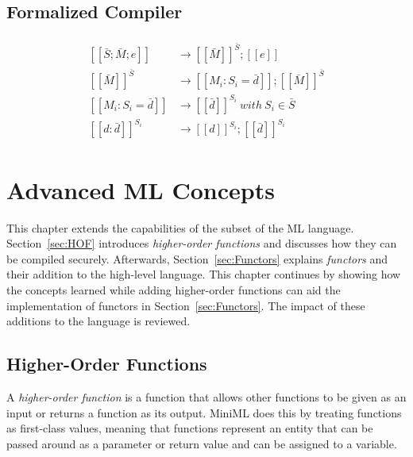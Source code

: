 \documentclass[10pt,a4paper]{report}
\begin{document}


\section{Formalized Compiler}
\newcommand{\compile}[1]{\left[\left[#1\right]\right]}
\newcommand{\makes}{& \rightarrow}
\begin{align*}
\begin{aligned}
\compile{\bar{S};\bar{M};e} \makes \compile{\bar{M}}^{\bar{S}};\compile{e}\\ 
\compile{\bar{M}}^{\bar{S}}\makes \compile{M_{i}:S_{i} = \bar{d}};\compile{\bar{M}}^{\bar{S}}\\
\compile{M_{i}:S_{i} = \bar{d}} \makes \compile{\bar{d}}^{S_{i}} \mathit{\ with\ } S_{i} \in \bar{S} \\
\compile{d:\bar{d}}^{S_{i}} \makes \compile{d}^{S_{i}};\compile{\bar{d}}^{S_{i}}
\end{aligned}
\end{align*}

\chapter{Advanced ML Concepts}

This chapter extends the capabilities of the subset of the ML language. Section~\ref{sec:HOF} introduces \emph{higher-order functions} and discusses how they can be compiled securely. Afterwards, Section~\ref{sec:Functors} explains \emph{functors} and their addition to the high-level language. This chapter continues by showing how the concepts learned while adding higher-order functions can aid the implementation of functors in Section~\ref{sec:Functors}. The impact of these additions to the language is reviewed.

\section{Higher-Order Functions\label{sec:HOF}}

A \emph{higher-order function} is a function that allows other functions to be given as an input or returns a function as its output. \mbox{MiniML} does this by treating functions as first-class values, meaning that functions represent an entity that can be passed around as a parameter or return value and can be assigned to a variable.
\end{document}
